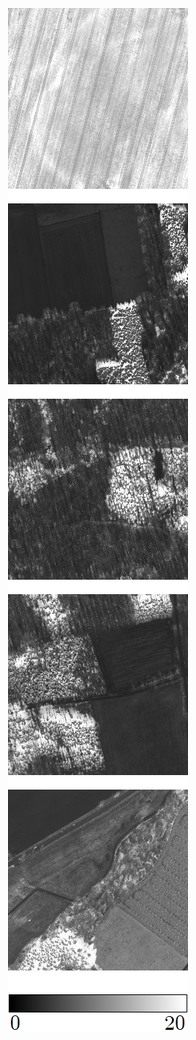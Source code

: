 \begin{figure}
\begin{subfigure}{\VegetationImageWidth}
        \caption{}
        \label{fig:svi_original}
    \end{subfigure} \hspace{2mm}
    \begin{subfigure}{\VegetationImageWidth}
        \includegraphics[width=\textwidth]{images/vegetation/rvi}

\end{subfigure}
\end{figure}
